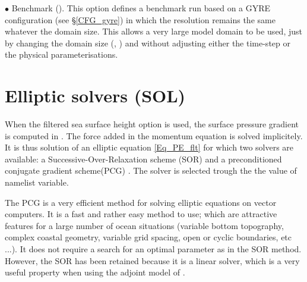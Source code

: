\documentclass[NEMO_book]{subfiles}
\begin{document}
$\bullet$  Benchmark (). This option defines a benchmark run based on 
a GYRE configuration (see \S\ref{CFG_gyre}) in which the resolution remains the same 
whatever the domain size. This allows a very large model domain to be used, just by 
changing the domain size (, ) and without adjusting either the time-step 
or the physical parameterisations. 


\section{Elliptic solvers (SOL)}
\label{MISC_sol}

When the filtered sea surface height option is used, the surface pressure gradient is 
computed in . The force added in the momentum equation is solved implicitely.
It is thus solution of an elliptic equation \eqref{Eq_PE_flt} for which two solvers are available: 
a Successive-Over-Relaxation scheme (SOR) and a preconditioned conjugate gradient 
scheme(PCG) \citep{Madec_al_OM88, Madec_PhD90}. The solver is selected trough the
the value of     namelist variable. 

The PCG is a very efficient method for solving elliptic equations on vector computers. 
It is a fast and rather easy method to use; which are attractive features for a large 
number of ocean situations (variable bottom topography, complex coastal geometry, 
variable grid spacing, open or cyclic boundaries, etc ...). It does not require 
a search for an optimal parameter as in the SOR method. However, the SOR has 
been retained because it is a linear solver, which is a very useful property when 
using the adjoint model of \NEMO.
\end{document}
